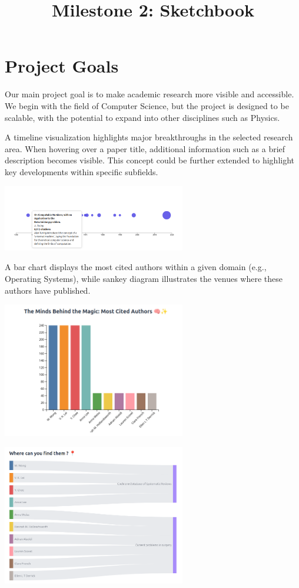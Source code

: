 \documentclass{article}
\title{Milestone 2: Sketchbook}
\begin{document}
\date{}
\maketitle

\section{Project Goals}
Our main project goal is to make academic research more visible and accessible.
We begin with the field of Computer Science, but the project is designed to be scalable, with the potential to expand into other disciplines such as Physics.

A timeline visualization highlights major breakthroughs in the selected research area.
When hovering over a paper title, additional information such as a brief description becomes visible.
This concept could be further extended to highlight key developments within specific subfields.

\begin{center}
\includegraphics[width=0.6\textwidth]{./pictures/timeline.png}
\end{center}

A bar chart displays the most cited authors within a given domain (e.g., Operating Systems), while sankey diagram illustrates the venues where these authors have published.

\begin{center}
\includegraphics[width=0.6\textwidth]{./pictures/most_cited.png}
\end{center}

\begin{center}
\includegraphics[width=0.6\textwidth]{./pictures/sankey.png}
\end{center}
\end{document}
